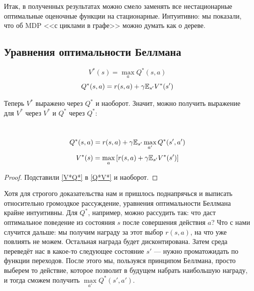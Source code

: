 Итак, в полученных результатах можно смело заменять все нестационарные оптимальные оценочные функции на стационарные. Интуитивно: мы показали, что об MDP <<с циклами в графе>> можно думать как о дереве.

\subsection{Уравнения оптимальности Беллмана}

\begin{theorem}
\begin{equation}\label{V*Q*}
V^*(s) = \max_a Q^*(s, a)
\end{equation}
\begin{equation}\label{Q*V*}
    Q^*(s, a) = r(s, a) + \gamma \mathbb{E}_{s'} V^*(s')
\end{equation}
\end{theorem}

Теперь $V^*$ выражено через $Q^*$ и наоборот. Значит, можно получить выражение для $V^*$ через $V^*$ и $Q^*$ через $Q^*$:

\begin{theorem}
\,
\begin{equation}\label{Q*Q*}
    Q^*(s, a) =  r(s, a) + \gamma \mathbb{E}_{s'} \max_{a'} Q^*(s', a')
\end{equation}
\begin{equation}\label{V*V*}
    V^*(s) =  \max_a \left[ r(s, a) + \gamma \mathbb{E}_{s'} V^*(s') \right]
\end{equation}
\begin{proof}
Подставили \eqref{V*Q*} в \eqref{Q*V*} и наоборот.
\end{proof}
\end{theorem}

Хотя для строгого доказательства нам и пришлось поднапрячься и выписать относительно громоздкое рассуждение, уравнения оптимальности Беллмана крайне интуитивны. Для $Q^*$, например, можно рассудить так: что даст оптимальное поведение из состояния $s$ после совершения действия $a$? Что с нами случится дальше: мы получим награду за этот выбор $r(s, a)$, на что уже повлиять не можем. Остальная награда будет дисконтирована. Затем среда переведёт нас в какое-то следующее состояние $s'$ --- нужно проматожидать по функции переходов. После этого мы, пользуяся принципом Беллмана, просто выберем то действие, которое позволит в будущем набрать наибольшую награду, и тогда сможем получить $\max\limits_{a'} Q^*(s', a')$. 

